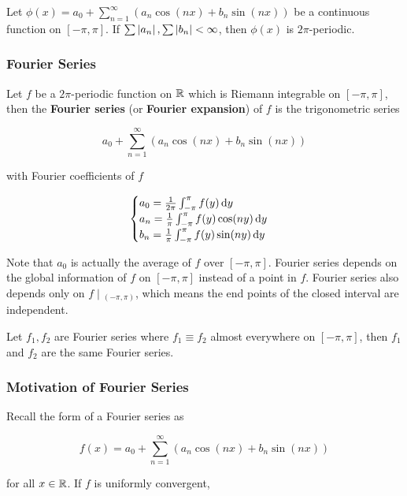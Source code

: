 \documentclass[a4paper,12pt]{article}
\begin{document}
\begin{pst}
  Let $\phi(x)=a_{0}+\sum_{n=1}^{\infty}(a_{n}\cos(nx)+b_{n}\sin(nx))$ be a continuous function on $[-\pi,\pi]$. If $\sum\left| a_{n}\right|,\sum\left| b_{n}\right|<\infty$, then $\phi(x)$ is $2\pi$-periodic.
\end{pst}

\propdisp

\subsubsection{Fourier Series}
\begin{dft}
  Let $f$ be a $2\pi$-periodic function on $\mathbb{R}$ which is Riemann integrable on $[-\pi,\pi]$, then the \textbf{Fourier series} (or \textbf{Fourier expansion}) of $f$ is the trigonometric series

  $$a_{0}+\sum_{n=1}^{\infty}(a_{n}\cos(nx)+b_{n}\sin(nx))$$\s

  with Fourier coefficients of $f$

  $$\begin{cases}
    a_{0}=\frac{1}{2\pi}\int_{-\pi}^{\pi}f(y)\,\mathrm{d} y\\
    a_{n}=\frac{1}{\pi}\int_{-\pi}^{\pi}f(y)\cos(ny)\,\mathrm{d} y\\
    b_{n}=\frac{1}{\pi}\int_{-\pi}^{\pi}f(y)\sin(ny)\,\mathrm{d} y
  \end{cases}$$
\end{dft}\n

Note that $a_{0}$ is actually the average of $f$ over $[-\pi,\pi]$. Fourier series depends on the global information of $f$ on $[-\pi,\pi]$ instead of a point in $f$. Fourier series also depends only on $f\!\mid\!_{(-\pi,\pi)}$, which means the end points of the closed interval are independent.\n

\begin{pst}
  Let $f_{1},f_{2}$ are Fourier series where $f_{1}\equiv f_{2}$ almost everywhere on $[-\pi,\pi]$, then $f_{1}$ and $f_{2}$ are the same Fourier series.
\end{pst}

\subsubsection{Motivation of Fourier Series}
Recall the form of a Fourier series as

$$f(x)=a_{0}+\sum_{n=1}^{\infty}(a_{n}\cos(nx)+b_{n}\sin(nx))$$\s

for all $x\in\mathbb{R}$. If $f$ is uniformly convergent,
\end{document}
